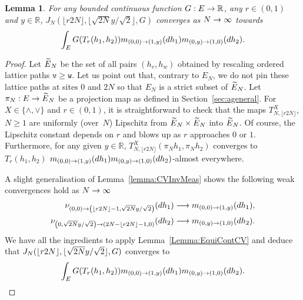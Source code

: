 \documentclass[10pt]{amsart}
\newtheorem{lemm}[theo]{Lemma}\newtheorem{prop}[theo]{Proposition}\newtheorem{coro}[theo]{Corollary}\newtheorem{conj}[theo]{Conjecture}
\theoremstyle{definition}\newtheorem{defi}[theo]{Definition}\newtheorem{rema}[theo]{Remark}\newtheorem{exam}[theo]{Example}\newtheorem{exem}[theo]{Example}\newtheorem{nota}[theo]{Notation}
\newcommand{\Wedge}{\wedge}\newcommand{\Vee}{\vee}
\theoremstyle{plain}
\newcommand{\tv}{\mathtt{v}}
\newcommand{\Tw}{\mathtt{w}}
\newcommand{\R}{\mathbb{R}}
\let\oldtilde\tilde
\renewcommand*{\tilde}[1]{\mathchoice{\widetilde{#1}}{\widetilde{#1}}{\oldtilde{#1}}{\oldtilde{#1}}}
\let\originalleft\left
\let\originalright\right
\renewcommand{\left}{\mathopen{}\mathclose\bgroup\originalleft}
\renewcommand{\right}{\aftergroup\egroup\originalright}
\renewcommand*{\to}{\mathchoice{\longrightarrow}{\rightarrow}{\rightarrow}{\rightarrow}}
\begin{document}
\begin{lemm}\label{lemma:CVJ}
For any bounded continuous function $G:E\to\R$, any $r\in (0,1)$ and $y\in\R$, $J_N(\lfloor r2N\rfloor, \lfloor\sqrt{2N} y/\sqrt{2}\rfloor,G)$ converges as $N\to\infty$ towards
\[
\int_E G(T_r(h_1,h_2)) m_{(0,0)\to (1,y)}(dh_1) m_{(0,y)\to (1,0)}(dh_2).
\]
\end{lemm}
\begin{proof}
Let $\tilde{E}_N$ be the set of all pairs $(h_v,h_w)$ obtained by rescaling ordered lattice paths $\tv \ge \Tw$. Let us point out that, contrary to $E_N$, we do not pin these lattice paths at sites $0$ and $2N$ so that $E_N$ is a strict subset of $\tilde{E}_N$. Let $\pi_N:E\to \tilde{E}_N$ be a projection map as defined in Section~\ref{sec:ageneral}. For $X\in \{\Wedge,\Vee\}$ and $r\in (0,1)$, it is straightforward to check that the maps $T_{N,\lfloor r2N \rfloor}^X$, $N\ge 1$ are uniformly (over~$N$) Lipschitz from $\tilde{E}_N\times \tilde{E}_N$ into $\tilde{E}_N$. Of course, the Lipschitz constant depends on $r$ and blows up as $r$ approaches $0$ or $1$. Furthermore, for any given $y\in\R$, $T_{N,\lfloor r2N \rfloor}^X(\pi_N h_1,\pi_N h_2)$ converges to $T_r(h_1,h_2)$ $m_{(0,0)\to (1,y)}(dh_1) m_{(0,y)\to (1,0)}(dh_2)$-almost everywhere.

A slight generalisation of Lemma~\ref{lemma:CVInvMeas} shows the following weak convergences hold as $N\to\infty$
\begin{align*}
\nu_{(0,0)\to \left(\lfloor r2N\rfloor-1,\sqrt{2N} y/\sqrt{2}\right)}(dh_1) \to m_{(0,0)\to (1,y)}(dh_1) ,\\
\nu_{\left(0,\sqrt{2N} y/\sqrt{2}\right)\to \left(2N-\lfloor r2N\rfloor-1,0\right)}(dh_2) \to m_{(0,y)\to (1,0)}(dh_2).
\end{align*}
We have all the ingredients to apply Lemma~\ref{Lemma:EquiContCV} and deduce that $J_N(\lfloor r2N\rfloor,\linebreak \lfloor\sqrt{2N} y/\sqrt{2}\rfloor,G)$ converges to
\[
\int_E G(T_r(h_1,h_2)) m_{(0,0)\to (1,y)}(dh_1) m_{(0,y)\to (1,0)}(dh_2).
\]
\end{proof}
\end{document}

